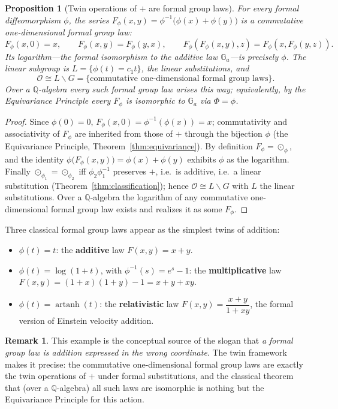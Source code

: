 \documentclass[11pt,a4paper,openany]{book}
\theoremstyle{plain}
\newtheorem{proposition}[theorem]{Proposition}
\theoremstyle{definition}
\newtheorem{remark}[theorem]{Remark}
\newcommand{\twing}[1]{\odot_{#1}}
\newcommand{\opspace}{\mathcal{O}}
\newcommand{\lingroup}{L}
\newcommand{\groupG}{G}
\begin{document}
\begin{proposition}[Twin operations of $+$ are formal group laws]\label{prop:fgl}
For every formal diffeomorphism $\phi$, the series $F_\phi(x,y)=\phi^{-1}\big(\phi(x)+\phi(y)\big)$ is a commutative one-dimensional formal group law:
\[
F_\phi(x,0)=x,\qquad F_\phi(x,y)=F_\phi(y,x),\qquad F_\phi(F_\phi(x,y),z)=F_\phi(x,F_\phi(y,z)).
\]
Its logarithm---the formal isomorphism to the additive law $\mathbb{G}_a$---is precisely $\phi$. The linear subgroup is $\lingroup=\{\phi(t)=c_1 t\}$, the linear substitutions, and
\[
\opspace\cong\lingroup\backslash\groupG=\{\text{commutative one-dimensional formal group laws}\}.
\]
Over a $\mathbb{Q}$-algebra every such formal group law arises this way; equivalently, by the Equivariance Principle every $F_\phi$ is isomorphic to $\mathbb{G}_a$ via $\Phi=\phi$.
\end{proposition}

\begin{proof}
Since $\phi(0)=0$, $F_\phi(x,0)=\phi^{-1}(\phi(x))=x$; commutativity and associativity of $F_\phi$ are inherited from those of $+$ through the bijection $\phi$ (the Equivariance Principle, Theorem~\ref{thm:equivariance}). By definition $F_\phi=\twing{\phi}$, and the identity $\phi\big(F_\phi(x,y)\big)=\phi(x)+\phi(y)$ exhibits $\phi$ as the logarithm. Finally $\twing{\phi_1}=\twing{\phi_2}$ iff $\phi_2\phi_1^{-1}$ preserves $+$, i.e.\ is additive, i.e.\ a linear substitution (Theorem~\ref{thm:classification}); hence $\opspace\cong\lingroup\backslash\groupG$ with $\lingroup$ the linear substitutions. Over a $\mathbb{Q}$-algebra the logarithm of any commutative one-dimensional formal group law exists and realizes it as some $F_\phi$.
\end{proof}

Three classical formal group laws appear as the simplest twins of addition:
\begin{itemize}
    \item $\phi(t)=t$: the \textbf{additive} law $F(x,y)=x+y$.
    \item $\phi(t)=\log(1+t)$, with $\phi^{-1}(s)=e^{s}-1$: the \textbf{multiplicative} law $F(x,y)=(1+x)(1+y)-1=x+y+xy$.
    \item $\phi(t)=\operatorname{artanh}(t)$: the \textbf{relativistic} law $F(x,y)=\dfrac{x+y}{1+xy}$, the formal version of Einstein velocity addition.
\end{itemize}

\begin{remark}
This example is the conceptual source of the slogan that \emph{a formal group law is addition expressed in the wrong coordinate}. The twin framework makes it precise: the commutative one-dimensional formal group laws are exactly the twin operations of $+$ under formal substitutions, and the classical theorem that (over a $\mathbb{Q}$-algebra) all such laws are isomorphic is nothing but the Equivariance Principle for this action.
\end{remark}
\end{document}

